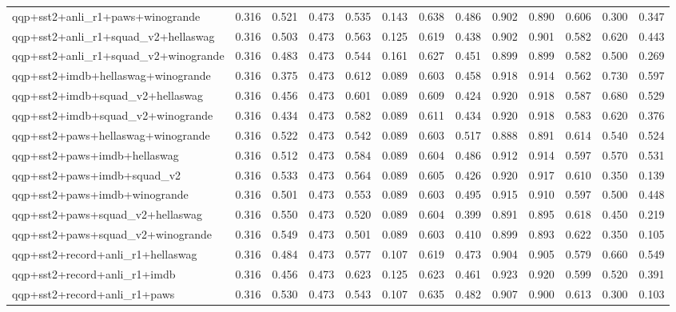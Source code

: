 \begin{table}[t]
\begin{tabular}{lrrrrrrrrrrrr}
    qqp+sst2+anli\_r1+paws+winogrande & 0.316 & 0.521 & 0.473 & 0.535 & 0.143 & 0.638 & 0.486 & 0.902 & 0.890 & 0.606 & 0.300 & 0.347 \\
    qqp+sst2+anli\_r1+squad\_v2+hellaswag & 0.316 & 0.503 & 0.473 & 0.563 & 0.125 & 0.619 & 0.438 & 0.902 & 0.901 & 0.582 & 0.620 & 0.443 \\
    qqp+sst2+anli\_r1+squad\_v2+winogrande & 0.316 & 0.483 & 0.473 & 0.544 & 0.161 & 0.627 & 0.451 & 0.899 & 0.899 & 0.582 & 0.500 & 0.269 \\
    qqp+sst2+imdb+hellaswag+winogrande & 0.316 & 0.375 & 0.473 & 0.612 & 0.089 & 0.603 & 0.458 & 0.918 & 0.914 & 0.562 & 0.730 & 0.597 \\
    qqp+sst2+imdb+squad\_v2+hellaswag & 0.316 & 0.456 & 0.473 & 0.601 & 0.089 & 0.609 & 0.424 & 0.920 & 0.918 & 0.587 & 0.680 & 0.529 \\
    qqp+sst2+imdb+squad\_v2+winogrande & 0.316 & 0.434 & 0.473 & 0.582 & 0.089 & 0.611 & 0.434 & 0.920 & 0.918 & 0.583 & 0.620 & 0.376 \\
    qqp+sst2+paws+hellaswag+winogrande & 0.316 & 0.522 & 0.473 & 0.542 & 0.089 & 0.603 & 0.517 & 0.888 & 0.891 & 0.614 & 0.540 & 0.524 \\
    qqp+sst2+paws+imdb+hellaswag & 0.316 & 0.512 & 0.473 & 0.584 & 0.089 & 0.604 & 0.486 & 0.912 & 0.914 & 0.597 & 0.570 & 0.531 \\
    qqp+sst2+paws+imdb+squad\_v2 & 0.316 & 0.533 & 0.473 & 0.564 & 0.089 & 0.605 & 0.426 & 0.920 & 0.917 & 0.610 & 0.350 & 0.139 \\
    qqp+sst2+paws+imdb+winogrande & 0.316 & 0.501 & 0.473 & 0.553 & 0.089 & 0.603 & 0.495 & 0.915 & 0.910 & 0.597 & 0.500 & 0.448 \\
    qqp+sst2+paws+squad\_v2+hellaswag & 0.316 & 0.550 & 0.473 & 0.520 & 0.089 & 0.604 & 0.399 & 0.891 & 0.895 & 0.618 & 0.450 & 0.219 \\
    qqp+sst2+paws+squad\_v2+winogrande & 0.316 & 0.549 & 0.473 & 0.501 & 0.089 & 0.603 & 0.410 & 0.899 & 0.893 & 0.622 & 0.350 & 0.105 \\
    qqp+sst2+record+anli\_r1+hellaswag & 0.316 & 0.484 & 0.473 & 0.577 & 0.107 & 0.619 & 0.473 & 0.904 & 0.905 & 0.579 & 0.660 & 0.549 \\
    qqp+sst2+record+anli\_r1+imdb & 0.316 & 0.456 & 0.473 & 0.623 & 0.125 & 0.623 & 0.461 & 0.923 & 0.920 & 0.599 & 0.520 & 0.391 \\
    qqp+sst2+record+anli\_r1+paws & 0.316 & 0.530 & 0.473 & 0.543 & 0.107 & 0.635 & 0.482 & 0.907 & 0.900 & 0.613 & 0.300 & 0.103 \\

\end{tabular}
\end{table}
